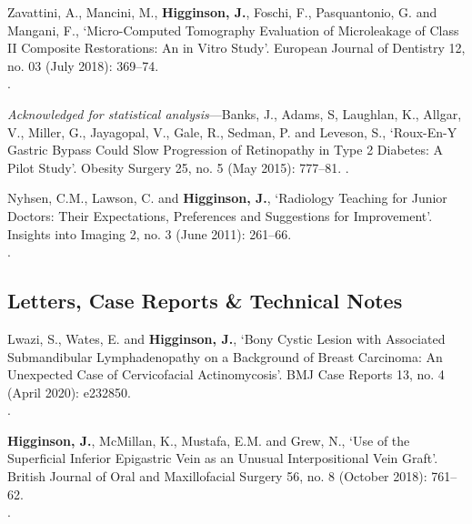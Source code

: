 \vspace{0.1cm}

 Zavattini, A., Mancini, M., \textbf{Higginson, J.}, Foschi, F., Pasquantonio, G. and Mangani, F., `Micro-Computed Tomography Evaluation of Microleakage of Class II Composite Restorations: An in Vitro Study’. European Journal of Dentistry 12, no. 03 (July 2018): 369–74. 
\\.

\vspace{0.1cm}

 \textit{Acknowledged for statistical analysis}---Banks, J., Adams, S, Laughlan, K., Allgar, V., Miller, G., Jayagopal, V., Gale, R., Sedman, P. and Leveson, S., `Roux-En-Y Gastric Bypass Could Slow Progression of Retinopathy in Type 2 Diabetes: A Pilot Study’. Obesity Surgery 25, no. 5 (May 2015): 777–81. .

\vspace{0.1cm}

 Nyhsen, C.M., Lawson, C. and \textbf{Higginson, J.}, `Radiology Teaching for Junior Doctors: Their Expectations, Preferences and Suggestions for Improvement’. Insights into Imaging 2, no. 3 (June 2011): 261–66. 
\\.



\subsection*{Letters, Case Reports \& Technical Notes}

 Lwazi, S., Wates, E. and \textbf{Higginson, J.}, `Bony Cystic Lesion with Associated Submandibular Lymphadenopathy on a Background of Breast Carcinoma: An Unexpected Case of Cervicofacial Actinomycosis’. BMJ Case Reports 13, no. 4 (April 2020): e232850. 
\\.

\vspace{0.1cm}

 \textbf{Higginson, J.}, McMillan, K., Mustafa, E.M.  and Grew, N., `Use of the Superficial Inferior Epigastric Vein as an Unusual Interpositional Vein Graft’. British Journal of Oral and Maxillofacial Surgery 56, no. 8 (October 2018): 761–62. 
\\.

\vspace{0.1cm}

